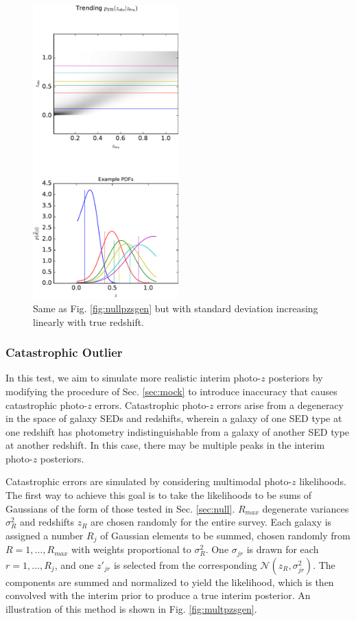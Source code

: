 \documentclass[preprint]{aastex}
\begin{document}
\begin{figure}
\includegraphics[width=0.5\textwidth]{figs/vars/zobsvztru.pdf}
\caption{Same as Fig. \ref{fig:nullpzsgen} but with standard deviation 
increasing linearly with true redshift.}
\label{fig:varspzs}
\end{figure}

\subsubsection{Catastrophic Outlier}
\label{sec:inaccuracy}

In this test, we aim to simulate more realistic interim photo-$z$ posteriors by 
modifying the procedure of Sec. \ref{sec:mock} to introduce inaccuracy that 
causes catastrophic photo-$z$ errors.  Catastrophic photo-$z$ errors arise from 
a degeneracy in the space of galaxy SEDs and redshifts, wherein a galaxy of one 
SED type at one redshift has photometry indistinguishable from a galaxy of 
another SED type at another redshift.  In this case, there may be multiple 
peaks in the interim photo-$z$ posteriors.  

Catastrophic errors are simulated by considering multimodal photo-$z$ 
likelihoods.  The first way to achieve this goal is to take the likelihoods to 
be sums of Gaussians of the form of those tested in Sec. \ref{sec:null}.  
$R_{max}$ degenerate variances $\sigma_{R}^{2} $ and redshifts $z_{R}$ are 
chosen randomly for the entire survey.  Each galaxy is assigned a number 
$R_{j}$ of Gaussian elements to be summed, chosen randomly from 
$R=1,\dots,R_{max}$ with weights proportional to $\sigma_{R}^{2}$.  One 
$\sigma_{jr}$ is drawn for each $r=1,\dots,R_{j}$, and one $z'_{jr}$ is 
selected from the corresponding $\mathcal{N}(z_{R},\sigma^{2}_{jr})$.  The 
components are summed and normalized to yield the likelihood, which is then 
convolved with the interim prior to produce a true interim posterior.   An 
illustration of this method is shown in Fig. \ref{fig:multpzsgen}. 
\end{document}
